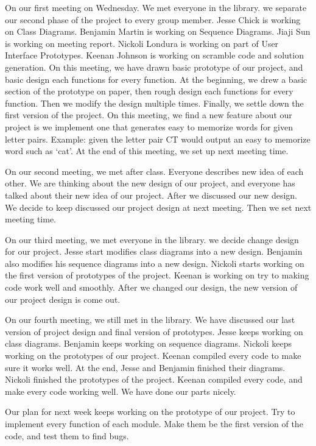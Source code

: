 \documentclass[12pt]{article}
\begin{document}
\par
On our first meeting on Wednesday. We met everyone in the library. we separate our second phase of the project to every group member. Jesse Chick is working on Class Diagrams. Benjamin Martin is working on Sequence Diagrams. Jiaji Sun is working on meeting report. Nickoli Londura is working on part of User Interface Prototypes. Keenan Johnson is working on scramble code and solution generation. On this meeting, we have drawn basic prototype of our project, and basic design each functions for every function. At the beginning, we drew a basic section of the prototype on paper, then rough design each functions for every function. Then we modify the design multiple times. Finally, we settle down the first version of the project. On this meeting, we find a new feature about our project is we implement one that generates easy to memorize words for given letter pairs. Example: given the letter pair CT would output an easy to memorize word such as ‘cat’. At the end of this meeting, we set up next meeting time. \\

\par
On our second meeting, we met after class. Everyone describes new idea of each other. We are thinking about the new design of our project, and everyone has talked about their new idea of our project. After we discussed our new design. We decide to keep discussed our project design at next meeting. Then we set next meeting time. \\

\par
On our third meeting, we met everyone in the library. we decide change design for our project. Jesse start modifies class diagrams into a new design. Benjamin also modifies his sequence diagrams into a new design. Nickoli starts working on the first version of prototypes of the project. Keenan is working on try to making code work well and smoothly. After we changed our design, the new version of our project design is come out. \\

\par
On our fourth meeting, we still met in the library. We have discussed our last version of project design and final version of prototypes. Jesse keeps working on class diagrams. Benjamin keeps working on sequence diagrams. Nickoli keeps working on the prototypes of our project. Keenan compiled every code to make sure it works well. At the end, Jesse and Benjamin finished their diagrams. Nickoli finished the prototypes of the project. Keenan compiled every code, and make every code working well. We have done our parts nicely. \\

\par
Our plan for next week keeps working on the prototype of our project. Try to implement every function of each module. Make them be the first version of the code, and test them to find bugs. \\

\cite{rubtut}



\end{document}
